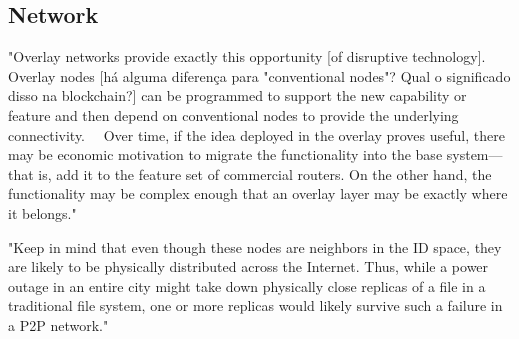 \subsection{Network}









"Overlay networks provide exactly this opportunity [of disruptive technology].
Overlay nodes [há alguma diferença para "conventional nodes"? Qual o significado disso na blockchain?] can be programmed to support the new capability or feature and then depend on conventional nodes to provide the underlying connectivity.
~~Over time, if the idea deployed in the overlay proves useful, there may be economic motivation to migrate the functionality into the base system—that is, add it to the feature set of commercial routers.
On the other hand, the functionality may be complex enough that an overlay layer may be exactly where it belongs."~~\cite{book:net-sys}

"Keep in mind that even though these nodes are neighbors in the ID space, they are likely to be physically distributed across the Internet.
Thus, while a power outage in an entire city might take down physically close replicas of a file in a traditional file system, one or more replicas would likely survive such a failure in a P2P network."~\cite{book:net-sys}
















